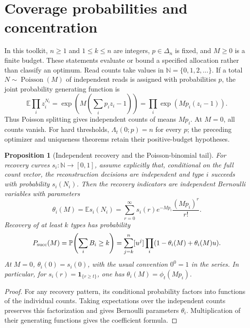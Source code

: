 \documentclass[11pt]{article}
\newtheorem{proposition}[theorem]{Proposition}
\theoremstyle{definition}
\theoremstyle{remark}
\DeclareMathOperator{\Poisson}{Poisson}
\newcommand{\E}{\mathbb E}
\newcommand{\Pbb}{\mathbb P}
\newcommand{\N}{\mathbb N}
\newcommand{\1}{\mathbf 1}
\begin{document}
\section{Coverage probabilities and concentration}
\label{sec:coverage-toolkit}
In this toolkit, \(n\ge1\) and \(1\le k\le n\) are integers,
\(p\in\Delta_n\) is fixed, and \(M\ge0\) is a finite budget.
These statements evaluate or bound a specified allocation rather than
classify an optimum. Read counts take values in
\(\N=\{0,1,2,\ldots\}\). If a total \(N\sim\Poisson(M)\) of
independent reads is assigned with probabilities \(p\), the joint
probability generating function is
\[
 \E\prod_i z_i^{N_i}
 =\exp\!\left(M\left(\sum_i p_i z_i-1\right)\right)
 =\prod_i\exp(Mp_i(z_i-1)).
\]
Thus Poisson splitting gives independent counts of means \(Mp_i\).
At \(M=0\), all counts vanish. For hard thresholds,
\(\Lambda_t(0;p)=n\) for every \(p\); the preceding optimizer and
uniqueness theorems retain their positive-budget hypotheses.

\begin{proposition}[Independent recovery and the Poisson-binomial tail]
\label{thm:poissonized-identity}
For recovery curves \(s_i:\N\to[0,1]\), assume explicitly that,
conditional on the \emph{full} count vector, the reconstruction decisions
are independent and type \(i\) succeeds with probability \(s_i(N_i)\).
Then the recovery indicators are independent Bernoulli variables with
parameters
\[
 \theta_i(M)=\E s_i(N_i)
 =\sum_{r=0}^{\infty}s_i(r)e^{-Mp_i}\frac{(Mp_i)^r}{r!}.
\]
Recovery of at least \(k\) types has probability
\[
 P_{\rm succ}(M)=\Pbb\!\left(\sum_i B_i\ge k\right)
 =\sum_{j=k}^n[u^j]\prod_i(1-\theta_i(M)+\theta_i(M)u).
\]
At \(M=0\), \(\theta_i(0)=s_i(0)\), with the usual convention
\(0^0=1\) in the series. In particular, for
\(s_i(r)=\1_{\{r\ge t\}}\), one has \(\theta_i(M)=\phi_t(Mp_i)\).
\end{proposition}
\begin{proof}
For any recovery pattern, its conditional probability factors into
functions of the individual counts. Taking expectations over the
independent counts preserves this factorization and gives Bernoulli
parameters \(\theta_i\). Multiplication of their generating functions
gives the coefficient formula.
\end{proof}
\end{document}
